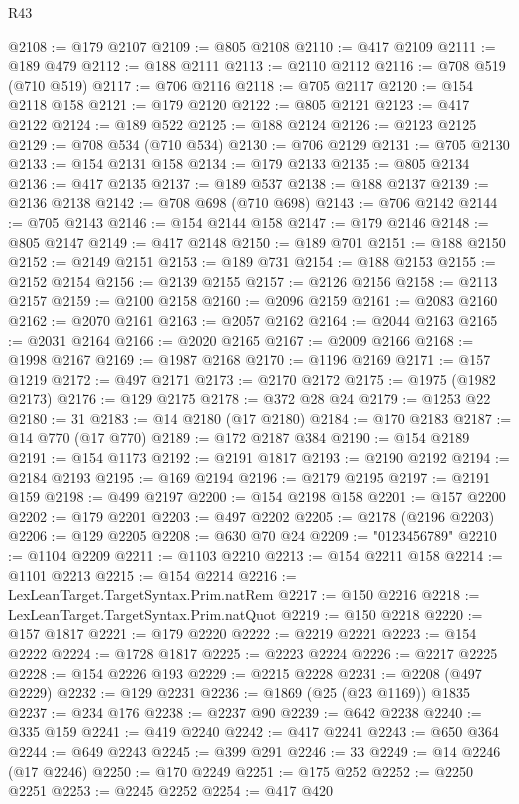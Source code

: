 \begin{lexlean}{R43}
\begin{coremodule}
@2108 := @179 @2107
@2109 := @805 @2108
@2110 := @417 @2109
@2111 := @189 @479
@2112 := @188 @2111
@2113 := @2110 @2112
@2116 := @708 @519 (@710 @519)
@2117 := @706 @2116
@2118 := @705 @2117
@2120 := @154 @2118 @158
@2121 := @179 @2120
@2122 := @805 @2121
@2123 := @417 @2122
@2124 := @189 @522
@2125 := @188 @2124
@2126 := @2123 @2125
@2129 := @708 @534 (@710 @534)
@2130 := @706 @2129
@2131 := @705 @2130
@2133 := @154 @2131 @158
@2134 := @179 @2133
@2135 := @805 @2134
@2136 := @417 @2135
@2137 := @189 @537
@2138 := @188 @2137
@2139 := @2136 @2138
@2142 := @708 @698 (@710 @698)
@2143 := @706 @2142
@2144 := @705 @2143
@2146 := @154 @2144 @158
@2147 := @179 @2146
@2148 := @805 @2147
@2149 := @417 @2148
@2150 := @189 @701
@2151 := @188 @2150
@2152 := @2149 @2151
@2153 := @189 @731
@2154 := @188 @2153
@2155 := @2152 @2154
@2156 := @2139 @2155
@2157 := @2126 @2156
@2158 := @2113 @2157
@2159 := @2100 @2158
@2160 := @2096 @2159
@2161 := @2083 @2160
@2162 := @2070 @2161
@2163 := @2057 @2162
@2164 := @2044 @2163
@2165 := @2031 @2164
@2166 := @2020 @2165
@2167 := @2009 @2166
@2168 := @1998 @2167
@2169 := @1987 @2168
@2170 := @1196 @2169
@2171 := @157 @1219
@2172 := @497 @2171
@2173 := @2170 @2172
@2175 := @1975 (@1982 @2173)
@2176 := @129 @2175
@2178 := @372 @28 @24
@2179 := @1253 @22
@2180 := 31
@2183 := @14 @2180 (@17 @2180)
@2184 := @170 @2183
@2187 := @14 @770 (@17 @770)
@2189 := @172 @2187 @384
@2190 := @154 @2189
@2191 := @154 @1173
@2192 := @2191 @1817
@2193 := @2190 @2192
@2194 := @2184 @2193
@2195 := @169 @2194
@2196 := @2179 @2195
@2197 := @2191 @159
@2198 := @499 @2197
@2200 := @154 @2198 @158
@2201 := @157 @2200
@2202 := @179 @2201
@2203 := @497 @2202
@2205 := @2178 (@2196 @2203)
@2206 := @129 @2205
@2208 := @630 @70 @24
@2209 := "0123456789"
@2210 := @1104 @2209
@2211 := @1103 @2210
@2213 := @154 @2211 @158
@2214 := @1101 @2213
@2215 := @154 @2214
@2216 := LexLeanTarget.TargetSyntax.Prim.natRem
@2217 := @150 @2216
@2218 := LexLeanTarget.TargetSyntax.Prim.natQuot
@2219 := @150 @2218
@2220 := @157 @1817
@2221 := @179 @2220
@2222 := @2219 @2221
@2223 := @154 @2222
@2224 := @1728 @1817
@2225 := @2223 @2224
@2226 := @2217 @2225
@2228 := @154 @2226 @193
@2229 := @2215 @2228
@2231 := @2208 (@497 @2229)
@2232 := @129 @2231
@2236 := @1869 (@25 (@23 @1169)) @1835
@2237 := @234 @176
@2238 := @2237 @90
@2239 := @642 @2238
@2240 := @335 @159
@2241 := @419 @2240
@2242 := @417 @2241
@2243 := @650 @364
@2244 := @649 @2243
@2245 := @399 @291
@2246 := 33
@2249 := @14 @2246 (@17 @2246)
@2250 := @170 @2249
@2251 := @175 @252
@2252 := @2250 @2251
@2253 := @2245 @2252
@2254 := @417 @420

\end{coremodule}
\end{lexlean}
